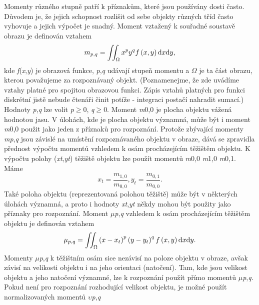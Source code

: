 \noindent Momenty různého stupně patří k příznakům, které jsou používány dosti často. Důvodem je, že jejich schopnost rozlišit od sebe objekty různých tříd často vyhovuje a jejich výpočet je snadný. Moment vztažený k souřadné soustavě obrazu je definován vztahem
\begin{equation} \label{GrindEQ__9_1_} 
m_{p,q} =\iint \nolimits _{\Omega }x^{p} y^{q} f\left(x,y\right){\rm d}x{\rm d}y ,  
\end{equation} 
kde \textit{f}(\textit{x},\textit{y}) je obrazová funkce, \textit{p},\textit{q} udávají stupeň momentu a $\Omega$ je ta část obrazu, kterou považujeme za rozpoznávaný objekt. (Poznamenejme, že zde uvádíme vztahy platné pro spojitou obrazovou funkci. Zápis vztahů platných pro funkci diskrétní jistě nebude čtenáři činit potíže - integraci postačí nahradit sumací.)  Hodnoty \textit{p},\textit{q} lze volit \textit{p}$\geq$0, \textit{q}$\geq$0. Moment \textit{m}0,0 je plocha objektu vážená hodnotou jasu. V úlohách, kde je plocha objektu významná, může být i moment \textit{m}0,0 použit jako jeden z příznaků pro rozpoznání. Protože zbývající momenty \textit{mp},\textit{q} jsou závislé na umístění rozpoznávaného objektu v obraze, dává se zpravidla přednost výpočtu momentů vzhledem k osám procházejícím těžištěm objektu. K výpočtu polohy (\textit{xt},\textit{yt}) těžiště objektu lze použít  momentů \textit{m}0,0 \textit{m}1,0 \textit{m}0,1. Máme 
\begin{equation} \label{GrindEQ__9_2_} 
x_{t} =\frac{m_{1,0} }{m_{0,0} } ,     y_{t} =\frac{m_{0,1} }{m_{0,0} } .  
\end{equation} 
Také poloha objektu (reprezentovaná polohou těžiště) může být v některých úlohách významná, a proto i hodnoty \textit{xt},\textit{yt} někdy mohou být použity jako příznaky pro rozpoznání. Moment $\mu$\textit{p},\textit{q} vzhledem k osám procházejícím těžištěm objektu je definován vztahem
\begin{equation} \label{GrindEQ__9_3_} 
\mu _{p,q} =\iint \nolimits _{\Omega }\left(x-x_{t} \right)^{p} \left(y-y_{t} \right)^{q} f\left(x,y\right){\rm d}x{\rm d}y .  
\end{equation} 
Momenty $\mu$\textit{p},\textit{q} k těžištním osám sice nezávisí na poloze objektu v obraze, avšak závisí na velikosti objektu i na jeho orientaci (natočení). Tam, kde jsou velikost objektu a jeho natočení významné, lze k rozpoznání použít přímo momentů $\mu$\textit{p},\textit{q}. Pokud není pro rozpoznání rozhodující velikost objektu, je možné použít normalizovaných momentů $\upsilon$\textit{p},\textit{q}  

